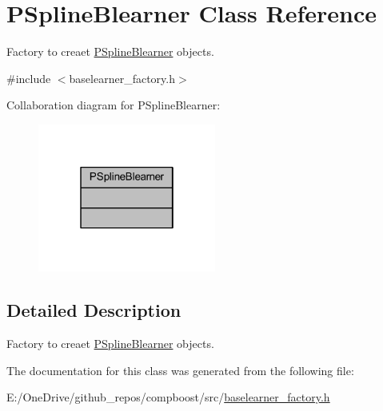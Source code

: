 \hypertarget{class_p_spline_blearner}{}\section{P\+Spline\+Blearner Class Reference}
\label{class_p_spline_blearner}


Factory to creaet {\ttfamily \mbox{\hyperlink{class_p_spline_blearner}{P\+Spline\+Blearner}}} objects.  




{\ttfamily \#include $<$baselearner\+\_\+factory.\+h$>$}



Collaboration diagram for P\+Spline\+Blearner\+:
\nopagebreak
\begin{figure}[H]
\begin{center}
\leavevmode
\includegraphics[width=166pt]{class_p_spline_blearner__coll__graph}
\end{center}
\end{figure}


\subsection{Detailed Description}
Factory to creaet {\ttfamily \mbox{\hyperlink{class_p_spline_blearner}{P\+Spline\+Blearner}}} objects. 

The documentation for this class was generated from the following file\+:\begin{DoxyCompactItemize}
\item 
E\+:/\+One\+Drive/github\+\_\+repos/compboost/src/\mbox{\hyperlink{baselearner__factory_8h}{baselearner\+\_\+factory.\+h}}\end{DoxyCompactItemize}
